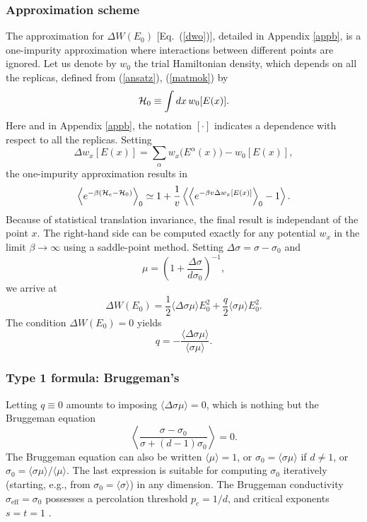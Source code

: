 \subsubsection{Approximation scheme}
The approximation for $\Delta W(E_0)$ [Eq.\ (\ref{dwo})], detailed in 
Appendix \ref{appb}, is a one-impurity approximation where interactions 
between different points are ignored. Let us denote by $w_0$ the 
trial Hamiltonian density, which depends on all the replicas, 
defined from (\ref{ansatz}), (\ref{matmok}) by
\begin{equation}
\label{hdens}
{\cal H}_0\equiv\int dx\, w_0[E(x)].
\end{equation}
Here and in Appendix \ref{appb}, the notation $[\cdot]$ indicates 
a dependence with respect to all the replicas.
Setting 
\begin{equation}
\label{dwx}
\Delta w_x[E(x)]=\sum_\alpha w_x\bigl(E^\alpha(x)\bigr)-w_0[E(x)],
\end{equation}
the one-impurity approximation results in
\begin{equation}
\label{oneimp}
\left\langle e^{-\beta({\cal H}_e-{\cal H}_0)}\right\rangle_0\simeq 
1+\frac{1}{v}\left\langle \left\langle e^{-\beta v \Delta w_x[E(x)]}\right\rangle_0-1\right\rangle.
\end{equation}
Because of statistical translation invariance, the final result is 
independant of the point $x$. The right-hand side can be computed 
exactly for any potential $w_x$ in the limit $\beta\to\infty$ using 
a saddle-point method. Setting $\Delta\sigma=\sigma-\sigma_0$ 
and
\begin{equation}
\mu=\left(1+\frac{\Delta\sigma}{d\sigma_0}\right)^{-1},
\end{equation}
we arrive at
\begin{equation}
\label{dwoi}
\Delta W(E_0)=\frac{1}{2}\langle\Delta\sigma \mu\rangle E_0^2
+\frac{q}{2}\langle \sigma\mu\rangle E_0^2.
\end{equation}
The condition $\Delta W(E_0)=0$ yields
\begin{equation}
\label{qbrug}
q=-\frac{\langle\Delta\sigma \mu\rangle}{\langle \sigma\mu\rangle}.
\end{equation}


\subsubsection{Type 1 formula: Bruggeman's}
Letting $q\equiv 0$ amounts to imposing $\langle\Delta\sigma 
\mu\rangle=0$, which is nothing but the Bruggeman equation
\begin{equation}
\left\langle\frac{\sigma-\sigma_0}{\sigma+(d-1)\sigma_0}\right\rangle=0.
\end{equation}
The Bruggeman equation can also be written $\langle\mu\rangle=1$, or $\sigma_0=\langle\sigma\mu\rangle$ if $d\not= 1$, or $\sigma_0=\langle\sigma\mu\rangle/\langle\mu\rangle$. 
The last expression is suitable for computing $\sigma_0$ iteratively 
(starting, e.g., from $\sigma_0=\langle\sigma\rangle$) in any 
dimension. The Bruggeman conductivity $\sigma_{\text{eff}}
=\sigma_0$ possesses a percolation threshold $p_c=1/d$, and critical 
exponents $s=t=1$ \cite{CLER90}.


